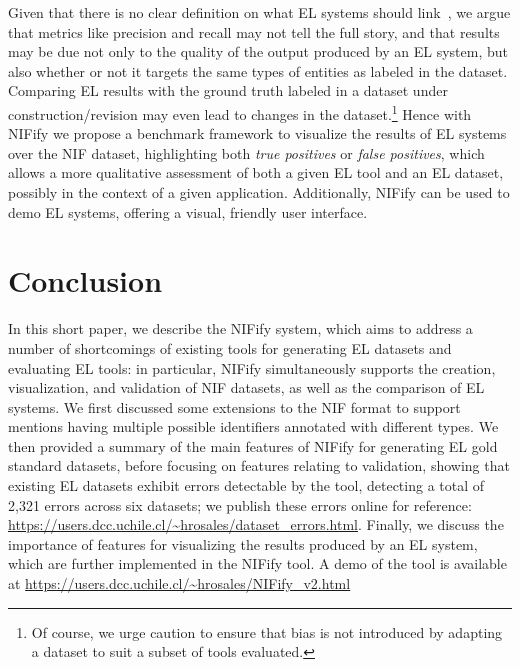 \documentclass[sigconf]{acmart}
\begin{document}
Given that there is no clear definition on what EL systems should link~\cite{ourAMW2018}, we argue that metrics like precision and recall may not tell the full story, and that results may be due not only to the quality of the output produced by an EL system, but also whether or not it targets the same types of entities as labeled in the dataset. Comparing EL results with the ground truth labeled in a dataset under construction/revision may even lead to changes in the dataset.\footnote{Of course, we urge caution to ensure that bias is not introduced by adapting a dataset to suit a subset of tools evaluated.} Hence with NIFify we propose a benchmark framework to visualize the results of EL systems over the NIF dataset, highlighting both \textit{true positives} or \textit{false positives}, which allows a more qualitative assessment of both a given EL tool and an EL dataset, possibly in the context of a given application. Additionally, NIFify can be used to demo EL systems, offering a visual, friendly user interface.


\section{Conclusion} 
\label{sec:conclusion}
In this short paper, we describe the NIFify system, which aims to address a number of shortcomings of existing tools for generating EL datasets and evaluating EL tools: in particular, NIFify simultaneously supports the creation, visualization, and validation of NIF datasets, as well as the comparison of EL systems. We first discussed some extensions to the NIF format to support mentions having multiple possible identifiers annotated with different types. We then provided a summary of the main features of NIFify for generating EL gold standard datasets, before focusing on features relating to validation, showing that existing EL datasets exhibit errors detectable by the tool, detecting a total of 2,321 errors across six datasets; we publish these errors online for reference: \url{https://users.dcc.uchile.cl/~hrosales/dataset_errors.html}. Finally, we discuss the importance of features for visualizing the results produced by an EL system, which are further implemented in the NIFify tool. A demo of the tool is available at \url{https://users.dcc.uchile.cl/~hrosales/NIFify\_v2.html} 

\end{document}
